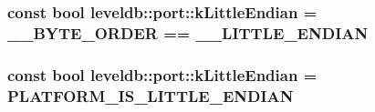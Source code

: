 \subsubsection[{k\+Little\+Endian}]{\setlength{\rightskip}{0pt plus 5cm}const bool leveldb\+::port\+::k\+Little\+Endian = \+\_\+\+\_\+\+B\+Y\+T\+E\+\_\+\+O\+R\+D\+E\+R == \+\_\+\+\_\+\+L\+I\+T\+T\+L\+E\+\_\+\+E\+N\+D\+I\+A\+N\hspace{0.3cm}{\ttfamily [static]}}\label{namespaceleveldb_1_1port_a1d2c52a3c3be0edb6562c9494b85bfec}
\hypertarget{namespaceleveldb_1_1port_a1d2c52a3c3be0edb6562c9494b85bfec}{}
\subsubsection[{k\+Little\+Endian}]{\setlength{\rightskip}{0pt plus 5cm}const bool leveldb\+::port\+::k\+Little\+Endian = {\bf P\+L\+A\+T\+F\+O\+R\+M\+\_\+\+I\+S\+\_\+\+L\+I\+T\+T\+L\+E\+\_\+\+E\+N\+D\+I\+A\+N}\hspace{0.3cm}{\ttfamily [static]}}\label{namespaceleveldb_1_1port_a1d2c52a3c3be0edb6562c9494b85bfec}
